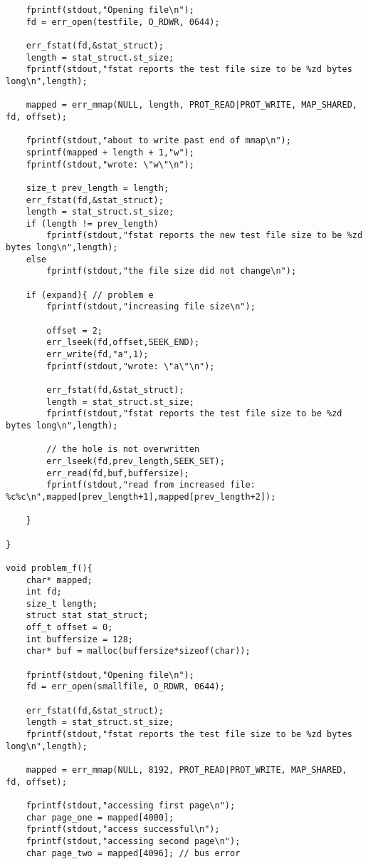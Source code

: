 \documentclass[12pt]{article}
\begin{document}
\begin{lstlisting}
    fprintf(stdout,"Opening file\n");
    fd = err_open(testfile, O_RDWR, 0644);

    err_fstat(fd,&stat_struct);
    length = stat_struct.st_size;
    fprintf(stdout,"fstat reports the test file size to be %zd bytes long\n",length);

    mapped = err_mmap(NULL, length, PROT_READ|PROT_WRITE, MAP_SHARED, fd, offset);

    fprintf(stdout,"about to write past end of mmap\n");
    sprintf(mapped + length + 1,"w");
    fprintf(stdout,"wrote: \"w\"\n");

    size_t prev_length = length;
    err_fstat(fd,&stat_struct);
    length = stat_struct.st_size;
    if (length != prev_length)
        fprintf(stdout,"fstat reports the new test file size to be %zd bytes long\n",length);
    else
        fprintf(stdout,"the file size did not change\n");

    if (expand){ // problem e
        fprintf(stdout,"increasing file size\n");

        offset = 2;
        err_lseek(fd,offset,SEEK_END);
        err_write(fd,"a",1);
        fprintf(stdout,"wrote: \"a\"\n");

        err_fstat(fd,&stat_struct);
        length = stat_struct.st_size;
        fprintf(stdout,"fstat reports the test file size to be %zd bytes long\n",length);

        // the hole is not overwritten
        err_lseek(fd,prev_length,SEEK_SET);
        err_read(fd,buf,buffersize);
        fprintf(stdout,"read from increased file: %c%c\n",mapped[prev_length+1],mapped[prev_length+2]);

    }

}

void problem_f(){
    char* mapped;
    int fd;
    size_t length;
    struct stat stat_struct;
    off_t offset = 0;
    int buffersize = 128;
    char* buf = malloc(buffersize*sizeof(char));

    fprintf(stdout,"Opening file\n");
    fd = err_open(smallfile, O_RDWR, 0644);

    err_fstat(fd,&stat_struct);
    length = stat_struct.st_size;
    fprintf(stdout,"fstat reports the test file size to be %zd bytes long\n",length);

    mapped = err_mmap(NULL, 8192, PROT_READ|PROT_WRITE, MAP_SHARED, fd, offset);

    fprintf(stdout,"accessing first page\n");
    char page_one = mapped[4000];
    fprintf(stdout,"access successful\n");
    fprintf(stdout,"accessing second page\n");
    char page_two = mapped[4096]; // bus error


\end{lstlisting}
\end{document}
